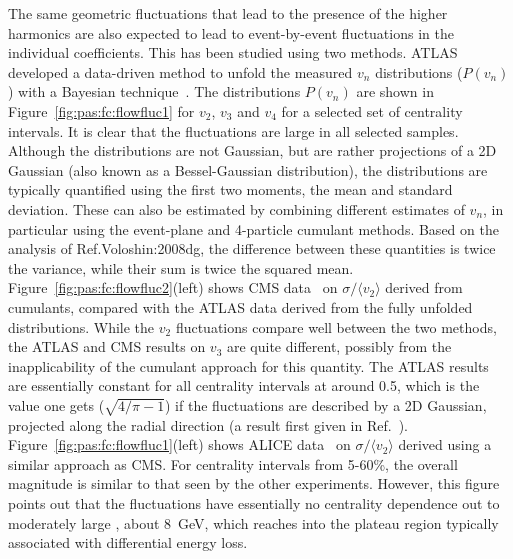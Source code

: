 The same geometric fluctuations that lead to the presence of the higher harmonics are also expected to lead to
event-by-event fluctuations in the individual coefficients.  This has been studied using two methods.
ATLAS developed a data-driven method to unfold the measured $v_n$ distributions ($P(v_n)$) with a Bayesian
technique~\cite{Aad:2013xma}.  The distributions $P(v_n)$ are shown in Figure~\ref{fig:pas:fc:flowfluc1} for $v_2$, $v_3$ and $v_4$
for a selected set of centrality intervals.  It is clear that the fluctuations are large in all selected samples.
Although the distributions are not Gaussian, but are rather projections of a 2D Gaussian (also known as a
Bessel-Gaussian distribution),
the distributions are typically quantified using the first two moments, the mean and standard deviation.
These can also be estimated by combining different estimates of $v_n$, in particular using the event-plane
and 4-particle cumulant methods.  Based on the analysis of Ref.{Voloshin:2008dg},
the difference between these quantities is twice the variance, while their sum is twice the squared mean.
Figure~\ref{fig:pas:fc:flowfluc2}(left) shows CMS data~\cite{Chatrchyan:2013kba} on $\sigma/\langle v_2 \rangle$ derived
from cumulants, compared with the ATLAS data derived from the fully unfolded distributions.
While the $v_2$ fluctuations compare well between the two methods, the ATLAS and CMS results on $v_3$
are quite different, possibly from the inapplicability of the cumulant approach for this quantity.
The ATLAS results are essentially constant for all centrality intervals at around 0.5, which is the
value one gets ($\sqrt{4/\pi-1}$) if the fluctuations are described by a 2D Gaussian,
projected along the radial direction (a result first given in Ref.~\cite{Broniowski:2007ft}).
Figure~\ref{fig:pas:fc:flowfluc1}(left) shows ALICE data~\cite{Abelev:2012di} on $\sigma/\langle v_2 \rangle$ derived
using a similar approach as CMS.  For centrality intervals from 5-60\%, the overall magnitude
is similar to that seen by the other experiments.  However, this figure points out that the fluctuations
have essentially no centrality dependence out to moderately large \pT, about 8~GeV, which reaches into
the plateau region typically associated with differential energy loss.




